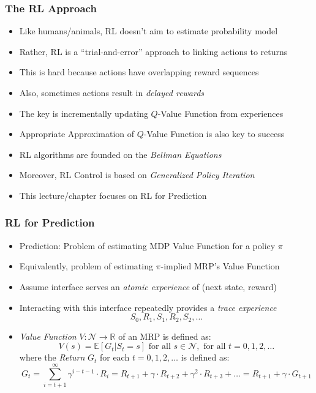 \documentclass[handout]{beamer}
\begin{document}
\begin{frame}
\frametitle{The RL Approach}
\begin{itemize}[<+->]
\item Like humans/animals, RL doesn't aim to estimate probability model
\item Rather, RL is a ``trial-and-error'' approach to linking actions to returns
\item This is hard because actions have overlapping reward sequences
\item Also, sometimes actions result in {\em delayed rewards}
\item The key is incrementally updating $Q$-Value Function from experiences
\item Appropriate Approximation of $Q$-Value Function is also key to success
\item RL algorithms are founded on the {\em Bellman Equations}
\item Moreover, RL Control is based on {\em Generalized Policy Iteration}
\item This lecture/chapter focuses on RL for Prediction
\end{itemize}
\end{frame}


\begin{frame}
\frametitle{RL for Prediction}
\pause
\begin{itemize}[<+->]
\item Prediction: Problem of estimating MDP Value Function for a policy $\pi$
\item Equivalently, problem of estimating $\pi$-implied MRP's Value Function
\item Assume interface serves an {\em atomic experience} of (next state, reward)
\item Interacting with this interface repeatedly provides a {\em trace experience}
$$S_0, R_1, S_1, R_2, S_2, \ldots$$
\item {\em Value Function} $V: \mathcal{N} \rightarrow \mathbb{R}$ of an MRP is defined as:
$$V(s) = \mathbb{E}[G_t|S_t = s] \text{ for all } s \in \mathcal{N}, \text{ for all } t = 0, 1, 2, \ldots$$
where the {\em Return} $G_t$ for each $t = 0, 1, 2, \ldots$ is defined as:
$$G_t = \sum_{i=t+1}^{\infty} \gamma^{i-t-1} \cdot R_i = R_{t+1} + \gamma \cdot R_{t+2} + \gamma^2 \cdot R_{t+3} + \ldots = R_{t+1} + \gamma \cdot G_{t+1}$$
\end{itemize}
\end{frame}
\end{document}
